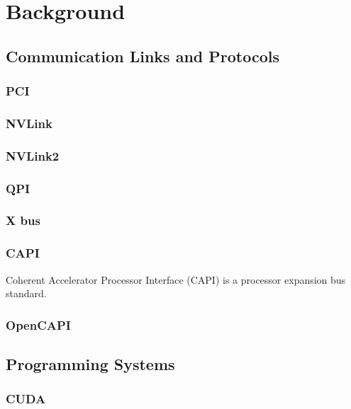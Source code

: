 \chapter{Background}


%
%
%
\section{Communication Links and Protocols}

\subsection{PCI}
\subsection{NVLink}
\subsection{NVLink2}
\subsection{QPI}
\subsection{X bus}
\subsection{CAPI}

Coherent Accelerator Processor Interface (CAPI) is a processor expansion bus standard.


\subsection{OpenCAPI}

%
%
%
\section{Programming Systems}
\subsection{CUDA}
\label{sec:cuda}





